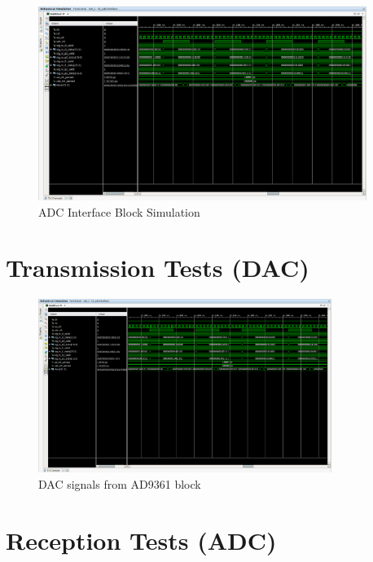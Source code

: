 \begin{figure}[htbp]
    \centering
    \includegraphics[width=0.95\textwidth]{./figures/adcInterface}
    \caption{ ADC Interface Block Simulation
    \label{fig:simadc}}
\end{figure}

\section{Transmission Tests (DAC)}
\label{result:dac}

\begin{figure}[htbp]
    \centering
    \includegraphics[width=0.85\textwidth]{./figures/adcInterface}
    \caption{ DAC signals from AD9361 block
    \label{fig:dacsignals}}
\end{figure}

\section{Reception Tests (ADC)}
\label{result:adc}

